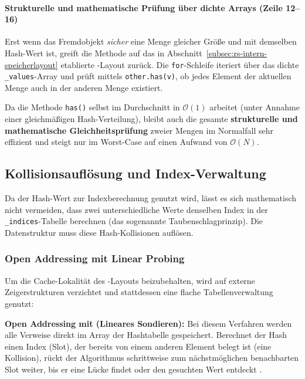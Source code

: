 \paragraph*{Strukturelle und mathematische Prüfung über dichte Arrays (Zeile 12–16)}
Erst wenn das Fremdobjekt \emph{sicher} eine Menge gleicher Größe und mit demselben Hash-Wert ist, greift die Methode auf das in Abschnitt~\ref{subsec:rs-intern-speicherlayout} etablierte -Layout zurück. Die \texttt{for}-Schleife iteriert über das dichte \texttt{_values}-Array und prüft mittels \texttt{other.has(v)}, ob jedes Element der aktuellen Menge auch in der anderen Menge existiert. 

Da die Methode \texttt{has()} selbst im Durchschnitt  in $\mathcal{O}(1)$ arbeitet (unter Annahme einer gleichmäßigen Hash-Verteilung), bleibt auch die gesamte \textbf{strukturelle und mathematische Gleichheitsprüfung} zweier Mengen im Normalfall sehr effizient und steigt nur im Worst-Case auf einen Aufwand von $\mathcal{O}(N)$.


\subsection{Kollisionsauflösung und Index-Verwaltung}
\label{subsec:rs-intern-kollisionen}

Da der Hash-Wert zur Indexberechnung genutzt wird, lässt es sich mathematisch nicht vermeiden, dass zwei unterschiedliche Werte denselben Index in der \texttt{_indices}-Tabelle berechnen (das sogenannte Taubenschlagprinzip). Die Datenstruktur muss diese Hash-Kollisionen auflösen.


\subsubsection{Open Addressing mit Linear Probing}
\label{subsubsec:rs-intern-linear-probing}

Um die Cache-Lokalität des -Layouts beizubehalten, wird auf externe Zeigerstrukturen verzichtet und stattdessen eine flache Tabellenverwaltung genutzt:

\begin{definition}
\label{def:open-addressing}
\textbf{Open Addressing mit  (Lineares Sondieren):} Bei diesem Verfahren werden alle Verweise direkt im Array der Hashtabelle gespeichert. Berechnet der Hash einen Index (Slot), der bereits von einem anderen Element belegt ist (eine Kollision), rückt der Algorithmus schrittweise zum nächstmöglichen benachbarten Slot weiter, bis er eine Lücke findet oder den gesuchten Wert entdeckt \autocite[293f]{cormen2022introduction}.
\end{definition}

